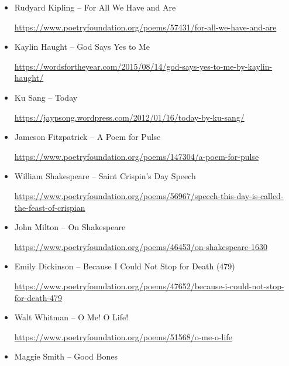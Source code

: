 \documentclass[12pt, openany, letterpaper]{memoir}
\begin{document}
\begin{itemize}
	\item Rudyard Kipling -- For All We Have and Are
	
	\hyperref[https://www.poetryfoundation.org/poems/57431/for-all-we-have-and-are]{https://www.poetryfoundation.org/poems/57431/for-all-we-have-and-are}
	
	\item Kaylin Haught -- God Says Yes to Me
	
	\hyperref[https://wordsfortheyear.com/2015/08/14/god-says-yes-to-me-by-kaylin-haught/]{https://wordsfortheyear.com/2015/08/14/god-says-yes-to-me-by-kaylin-haught/}
	
	\item Ku Sang -- Today
	
	\hyperref[https://jaypsong.wordpress.com/2012/01/16/today-by-ku-sang/]{https://jaypsong.wordpress.com/2012/01/16/today-by-ku-sang/}
	
	\item Jameson Fitzpatrick -- A Poem for Pulse
	
	\hyperref[https://www.poetryfoundation.org/poems/147304/a-poem-for-pulse]{https://www.poetryfoundation.org/poems/147304/a-poem-for-pulse}
	
	\item William Shakespeare -- Saint Crispin's Day Speech
	
	\hyperref[https://www.poetryfoundation.org/poems/56967/speech-this-day-is-called-the-feast-of-crispian]{https://www.poetryfoundation.org/poems/56967/speech-this-day-is-called-the-feast-of-crispian}
	
	\item John Milton -- On Shakespeare
	
	\hyperref[https://www.poetryfoundation.org/poems/46453/on-shakespeare-1630]{https://www.poetryfoundation.org/poems/46453/on-shakespeare-1630}
	
	\item Emily Dickinson -- Because I Could Not Stop for Death (479)
	
	\hyperref[https://www.poetryfoundation.org/poems/47652/because-i-could-not-stop-for-death-479]{https://www.poetryfoundation.org/poems/47652/because-i-could-not-stop-for-death-479}
	
	\item Walt Whitman -- O Me! O Life!
	
	\hyperref[https://www.poetryfoundation.org/poems/51568/o-me-o-life]{https://www.poetryfoundation.org/poems/51568/o-me-o-life}
	
	\item Maggie Smith -- Good Bones
	

\end{itemize}
\end{document}
